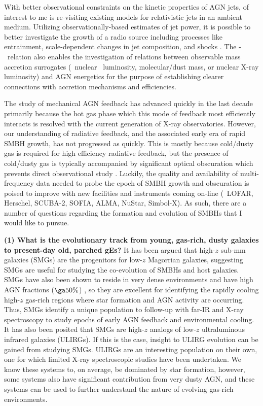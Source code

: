 \documentclass[11pt]{article}
\begin{document}
With better observational constraints on the kinetic properties of AGN
jets, of interest to me is re-visiting existing models for
relativistic jets in an ambient medium. Utilizing
observationally-based estimates of jet power, it is possible to better
investigate the growth of a radio source including processes like
entrainment, scale-dependent changes in jet composition, and shocks
\cite[\'a la][]{1999MNRAS.309.1017W}. The \pjet-\lrad\ relation also
enables the investigation of relations between observable mass
accretion surrogates (\ie\ nuclear \halpha\ luminosity, molecular/dust
mass, or nuclear X-ray luminosity) and AGN energetics for the purpose
of establishing clearer connections with accretion mechanisms and
efficiencies.

The study of mechanical AGN feedback has advanced quickly in the last
decade primarily because the hot gas phase which this mode of feedback
most efficiently interacts is resolved with the current generation of
X-ray observatories. However, our understanding of radiative feedback,
and the associated early era of rapid SMBH growth, has not progressed
as quickly. This is mostly because cold/dusty gas is required for high
efficiency radiative feedback, but the presence of cold/dusty gas is
typically accompanied by significant optical obscuration which
prevents direct observational study
\cite{2009arXiv0911.3911A}. Luckily, the quality and availability
of multi-frequency data needed to probe the epoch of SMBH growth and
obscuration is poised to improve with new facilities and instruments
coming on-line (\ie\ LOFAR, Herschel, SCUBA-2, SOFIA, ALMA, NuStar,
Simbol-X). As such, there are a number of questions regarding the
formation and evolution of SMBHs that I would like to pursue.

{\bf{(1) What is the evolutionary track from young, gas-rich, dusty
galaxies to present-day old, parched gEs?}} It has been argued that
high-$z$ sub-mm galaxies (SMGs) are the progenitors for low-$z$
Magorrian galaxies, suggesting SMGs are useful for studying the
co-evolution of SMBHs and host galaxies. SMGs have also been shown to
reside in very dense environments and have high AGN fractions ($\ga
50\%$) \cite{2005ApJ...632..736A}, so they are excellent for
identifying the rapidly cooling high-$z$ gas-rich regions where star
formation and AGN activity are occurring. Thus, SMGs identify a unique
population to follow-up with far-IR and X-ray spectroscopy to study
epochs of early AGN feedback and environmental cooling. It has also
been posited that SMGs are high-$z$ analogs of low-$z$ ultraluminous
infrared galaxies (ULIRGs). If this is the case, insight to ULIRG
evolution can be gained from studying SMGs. ULIRGs are an interesting
population on their own, one for which limited X-ray spectroscopic
studies have been undertaken. We know these systems to, on average, be
dominated by star formation, however, some systems also have
significant contribution from very dusty AGN, and these systems can be
used to further understand the nature of evolving gas-rich
environments.
\end{document}
